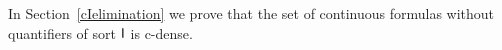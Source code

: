 \documentclass{amsproc}
\renewcommand*{\emph}[1]{%
   \smash{\tikz[baseline]\node[rectangle, fill=teal!25, rounded corners, inner xsep=0.5ex, inner ysep=0.2ex, anchor=base, minimum height = 2.7ex]{\strut #1};}}
\begin{document}
In Section~\ref{cIelimination} we prove that the set of continuous formulas without quantifiers of sort ${\sf I}$ is c-dense.
 


\begin{comment}
\section{Morphisms}\label{morphisms}

\def\ceq#1#2#3{\parbox[t]{34ex}{$\displaystyle #1$}\parbox{6ex}{\hfil $#2$}{$\displaystyle #3$}}

Let $M$ and $N$ be two standard structures.
We say that a partial map $f:M\to N$ is \emph{p-elementary\/} if for every $\varphi(x)\in{\EuScript L}^{\rm p}$ and every $a\in({\rm dom }f)^{|x|}$

\ceq{1.\hfill M\models\varphi(a)}{\Rightarrow}{N\models\varphi(fa).}

In words, we say that $f$ \emph{preserve the truth\/} of the positive formulas.
A p-elementary map that is total is called a p-elementary \emph{embedding.}
When the identity map ${\rm id}_M:M\rightarrow N$ is an p-elementary embedding, 
%
%
we write \emph{$M\preceq^{\rm p} N$\/} and say that $M$ is an p-elementary \emph{substructure\/} of $N$.

The discussion of c-elementarity needs some extra care because ${\EuScript L}^{\rm c}$ does not contains equality in the home sort.
Therefore we postpone it till Section~\ref{cIelimination}.

On the other hand, as p-elementary maps are in particular ${\EuScript L}_{\sf H}$-elementary, they are injective.
However, their inverse need not be p-elementary.
In other words, the converse of the implication in (1) may not hold.
Hence the following notion of elementarity which is more roboust.
We say that the map $f:M\to N$ is an \emph{approximate\/} p-elementary if for every formula $\varphi(x)\in{\EuScript L}^{\rm p}$, and every $a\in({\rm dom }f)^{|x|}$


\end{comment}
\end{document}
